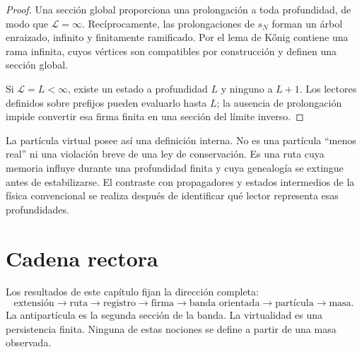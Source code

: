 \begin{proof}
Una sección global proporciona una prolongación a toda profundidad, de modo
que \(\mathcal L=\infty\). Recíprocamente, las prolongaciones de \(s_N\)
forman un árbol enraizado, infinito y finitamente ramificado. Por el lema de
Kőnig contiene una rama infinita, cuyos vértices son compatibles por
construcción y definen una sección global.

Si \(\mathcal L=L<\infty\), existe un estado a profundidad \(L\) y ninguno
a \(L+1\). Los lectores definidos sobre prefijos pueden evaluarlo hasta
\(L\); la ausencia de prolongación impide convertir esa firma finita en una
sección del límite inverso.
\end{proof}

La partícula virtual posee así una definición interna. No es una partícula
``menos real'' ni una violación breve de una ley de conservación. Es una
ruta cuya memoria influye durante una profundidad finita y cuya genealogía
se extingue antes de estabilizarse. El contraste con propagadores y estados
intermedios de la física convencional se realiza después de identificar qué
lector representa esas profundidades.

\section{Cadena rectora}

Los resultados de este capítulo fijan la dirección completa:
\[
\boxed{
\text{extensión}\to
\text{ruta}\to
\text{registro}\to
\text{firma}\to
\text{banda orientada}\to
\text{partícula}\to
\text{masa}.}
\]
La antipartícula es la segunda sección de la banda. La virtualidad es una
persistencia finita. Ninguna de estas nociones se define a partir de una
masa observada.
